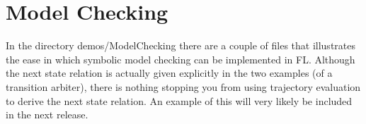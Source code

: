\section{Model Checking}

In the directory demos/ModelChecking there are a couple of files
that illustrates the ease in which symbolic model checking%
%
{}%
%
{} can be
implemented in FL.
Although the next state relation is actually given explicitly
in the two examples (of a transition arbiter), there is nothing
stopping you from using trajectory evaluation to derive the
next state relation.
An example of this will very likely be included in the next release.

